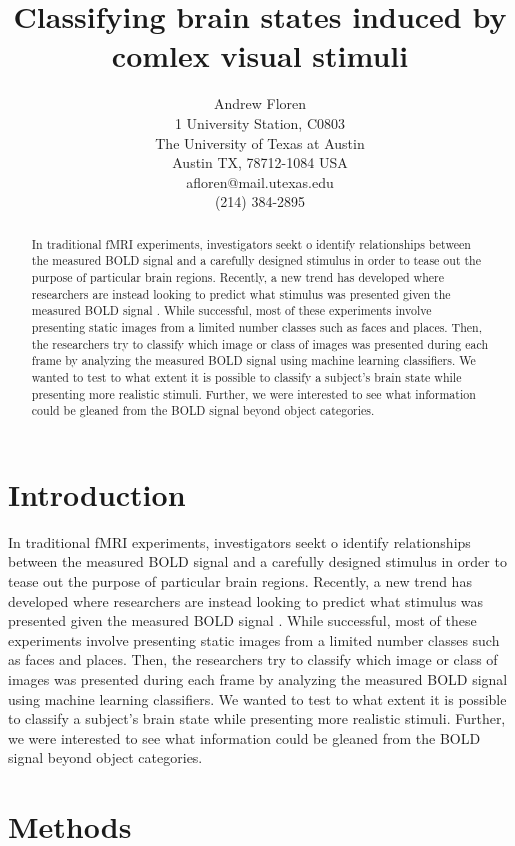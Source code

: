 \documentclass[draft]{article}
\title{Classifying brain states induced by comlex visual stimuli}
\author{Andrew Floren\\
1 University Station, C0803\\
The University of Texas at Austin\\
Austin TX, 78712-1084 USA\\
afloren@mail.utexas.edu\\
(214) 384-2895\\}
\date{}
\begin{document}
\maketitle

\begin{abstract}
In traditional fMRI experiments, investigators seekt o identify relationships between the measured BOLD signal and a carefully designed stimulus in order to tease out the purpose of particular brain regions.
Recently, a new trend has developed where researchers are instead looking to predict what stimulus was presented given the measured BOLD signal \cite{fmri-ml1,fmri-ml2,fmri-ml3}.
While successful, most of these experiments involve presenting static images from a limited number classes such as faces and places.
Then, the researchers try to classify which image or class of images was presented during each frame by analyzing the measured BOLD signal using machine learning classifiers.
We wanted to test to what extent it is possible to classify a subject's brain state while presenting more realistic stimuli.
Further, we were interested to see what information could be gleaned from the BOLD signal beyond object categories.
\end{abstract}

\tableofcontents

\section{Introduction}
In traditional fMRI experiments, investigators seekt o identify relationships between the measured BOLD signal and a carefully designed stimulus in order to tease out the purpose of particular brain regions.
Recently, a new trend has developed where researchers are instead looking to predict what stimulus was presented given the measured BOLD signal \cite{fmri-ml1,fmri-ml2,fmri-ml3}.
While successful, most of these experiments involve presenting static images from a limited number classes such as faces and places.
Then, the researchers try to classify which image or class of images was presented during each frame by analyzing the measured BOLD signal using machine learning classifiers.
We wanted to test to what extent it is possible to classify a subject's brain state while presenting more realistic stimuli.
Further, we were interested to see what information could be gleaned from the BOLD signal beyond object categories.

\section{Methods}
\end{document}
